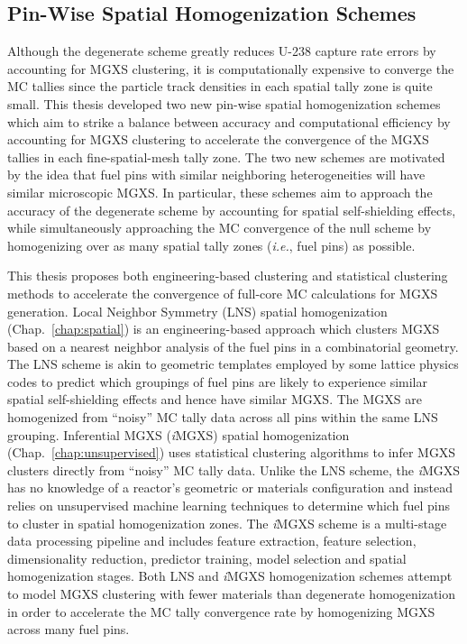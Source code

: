 
\subsection{Pin-Wise Spatial Homogenization Schemes}
\label{subsec:chap12-homogenization-schemes}

Although the degenerate scheme greatly reduces U-238 capture rate errors by accounting for \ac{MGXS} clustering, it is computationally expensive to converge the \ac{MC} tallies since the particle track densities in each spatial tally zone is quite small. This thesis developed two new pin-wise spatial homogenization schemes which aim to strike a balance between accuracy and computational efficiency by accounting for \ac{MGXS} clustering to accelerate the convergence of the \ac{MGXS} tallies in each fine-spatial-mesh tally zone. The two new schemes are motivated by the idea that fuel pins with similar neighboring heterogeneities will have similar microscopic \ac{MGXS}. In particular, these schemes aim to approach the accuracy of the degenerate scheme by accounting for spatial self-shielding effects, while simultaneously approaching the \ac{MC} convergence of the null scheme by homogenizing over as many spatial tally zones (\textit{i.e.}, fuel pins) as possible.


This thesis proposes both engineering-based clustering and statistical clustering methods to accelerate the convergence of full-core \ac{MC} calculations for \ac{MGXS} generation. Local Neighbor Symmetry (LNS) spatial homogenization (Chap.~\ref{chap:spatial}) is an engineering-based approach which clusters \ac{MGXS} based on a nearest neighbor analysis of the fuel pins in a combinatorial geometry. The \ac{LNS} scheme is akin to geometric templates employed by some lattice physics codes to predict which groupings of fuel pins are likely to experience similar spatial self-shielding effects and hence have similar \ac{MGXS}. The MGXS are homogenized from ``noisy'' \ac{MC} tally data across all pins within the same \ac{LNS} grouping. Inferential \ac{MGXS} (\textit{i}\ac{MGXS}) spatial homogenization (Chap.~\ref{chap:unsupervised}) uses statistical clustering algorithms to infer \ac{MGXS} clusters directly from ``noisy'' \ac{MC} tally data. Unlike the \ac{LNS} scheme, the \textit{i}\ac{MGXS} has no knowledge of a reactor's geometric or materials configuration and instead relies on unsupervised machine learning techniques to determine which fuel pins to cluster in spatial homogenization zones. The \textit{i}\ac{MGXS} scheme is a multi-stage data processing pipeline and includes feature extraction, feature selection, dimensionality reduction, predictor training, model selection and spatial homogenization stages. Both \ac{LNS} and \textit{i}\ac{MGXS} homogenization schemes attempt to model \ac{MGXS} clustering with fewer materials than degenerate homogenization in order to accelerate the \ac{MC} tally convergence rate by homogenizing \ac{MGXS} across many fuel pins.

